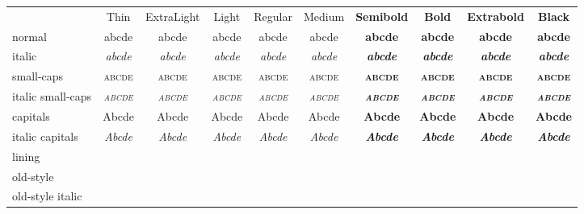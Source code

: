 \documentclass[11pt]{standalone}
\newcommand*\spA{abcde}
\newcommand*\spB{01469}
\newcommand*\spr[1][\spA]{& #1 & #1 & #1 & #1 & #1 & #1 & #1 & #1 & #1\\}
\begin{document}
\begin{tabular}{
		>{}l
		>{\ralewaythin}c
		>{\ralewayextra}c
		>{\ralewaylight}c
		>{\raleway}c
		>{\ralewaymedium}c
		>{\ralewaylight\bfseries}c
		>{\raleway\bfseries}c
		>{\ralewayextra\bfseries}c
		>{\ralewaythin\bfseries}c }
	& Thin & ExtraLight & Light & Regular & Medium & Semibold & Bold & Extrabold & Black \\
	normal               \spr
	italic               \spr[\itshape\spA]
	small-caps           \spr[\scshape\spA]
	italic small-caps    \spr[\scshape\itshape\spA]
	capitals             \spr[\MakeUppercase\spA]
	italic capitals      \spr[\itshape\MakeUppercase\spA]
	lining               \spr[\liningnums{\spB}]
	old-style            \spr[\oldstylenums{\spB}]
	old-style italic     \spr[\oldstylenums{\itshape\spB}]
\end{tabular}
\end{document}
